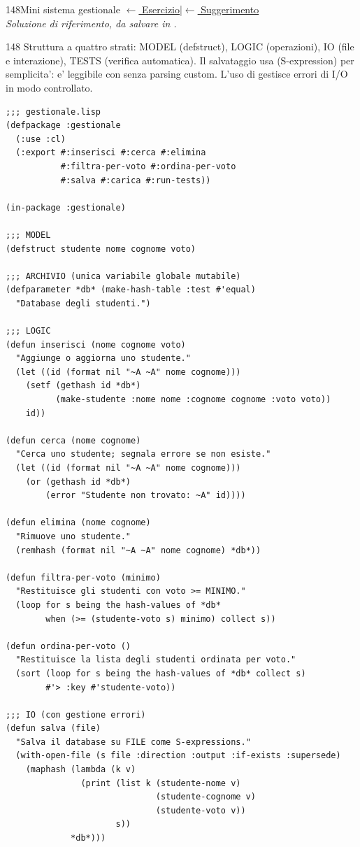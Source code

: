 \label{sol:148}
\begin{solbox}{148}{Mini sistema gestionale}
\small\color{black!55}\hyperref[ex:148]{$\leftarrow$ Esercizio}\enspace\textcolor{black!30}{|}\enspace\hyperref[hint:148]{$\leftarrow$ Suggerimento}\normalsize\color{black}\\
\textit{Soluzione di riferimento, da salvare in .}

\begin{ragionamentoBox}{148}
Struttura a quattro strati: MODEL (defstruct), LOGIC (operazioni),
IO (file e interazione), TESTS (verifica automatica).
Il salvataggio usa  (S-expression) per semplicita':
e' leggibile con  senza parsing custom.
L'uso di  gestisce errori di I/O in modo controllato.
\end{ragionamentoBox}
\begin{lstlisting}
;;; gestionale.lisp
(defpackage :gestionale
  (:use :cl)
  (:export #:inserisci #:cerca #:elimina
           #:filtra-per-voto #:ordina-per-voto
           #:salva #:carica #:run-tests))

(in-package :gestionale)

;;; MODEL
(defstruct studente nome cognome voto)

;;; ARCHIVIO (unica variabile globale mutabile)
(defparameter *db* (make-hash-table :test #'equal)
  "Database degli studenti.")

;;; LOGIC
(defun inserisci (nome cognome voto)
  "Aggiunge o aggiorna uno studente."
  (let ((id (format nil "~A ~A" nome cognome)))
    (setf (gethash id *db*)
          (make-studente :nome nome :cognome cognome :voto voto))
    id))

(defun cerca (nome cognome)
  "Cerca uno studente; segnala errore se non esiste."
  (let ((id (format nil "~A ~A" nome cognome)))
    (or (gethash id *db*)
        (error "Studente non trovato: ~A" id))))

(defun elimina (nome cognome)
  "Rimuove uno studente."
  (remhash (format nil "~A ~A" nome cognome) *db*))

(defun filtra-per-voto (minimo)
  "Restituisce gli studenti con voto >= MINIMO."
  (loop for s being the hash-values of *db*
        when (>= (studente-voto s) minimo) collect s))

(defun ordina-per-voto ()
  "Restituisce la lista degli studenti ordinata per voto."
  (sort (loop for s being the hash-values of *db* collect s)
        #'> :key #'studente-voto))

;;; IO (con gestione errori)
(defun salva (file)
  "Salva il database su FILE come S-expressions."
  (with-open-file (s file :direction :output :if-exists :supersede)
    (maphash (lambda (k v)
               (print (list k (studente-nome v)
                              (studente-cognome v)
                              (studente-voto v))
                      s))
             *db*)))


\end{lstlisting}
\end{solbox}
